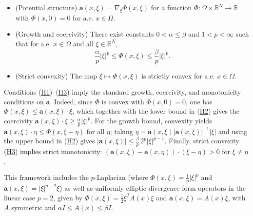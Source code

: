 \documentclass[10pt,twoside,english,reqno,a4paper]{amsart}
\theoremstyle{plain}
\theoremstyle{plain}
\theoremstyle{definition}
\theoremstyle{remark}
\numberwithin{equation}{section}
\newcommand{\R}{\mathbb{R}}
\def\ae{\mathrm{a.e.}}
\begin{document}
\begin{itemize}
\item[\hypertarget{hyp:potential}{(H1)}] (Potential structure) $\mathbf{a}(x,\xi) = \nabla_\xi \Phi(x,\xi)$ for a function $\Phi:\Omega\times\R^N\to\R$ with $\Phi(x,0)=0$ for $\ae$ $x\in\Omega$.

\item[\hypertarget{hyp:growth}{(H2)}] (Growth and coercivity) There exist constants $0 < \alpha \leq \beta$ and $1 < p < \infty$ such that for $\ae$ $x \in \Omega$ and all $\xi \in \R^N$,
\begin{equation*}
\frac{\alpha}{p} |\xi|^p \leq \Phi(x,\xi) \leq \frac{\beta}{p} |\xi|^p.
\end{equation*}

\item[\hypertarget{hyp:convex}{(H3)}] (Strict convexity) The map $\xi \mapsto \Phi(x,\xi)$ is strictly convex for $\ae$ $x \in \Omega$.
\end{itemize}

Conditions \textnormal{(\hyperlink{hyp:potential}{H1})--(\hyperlink{hyp:convex}{H3})} imply the standard growth, coercivity, and monotonicity conditions on $\mathbf{a}$. Indeed, since $\Phi$ is convex with $\Phi(x,0)=0$, one has $\Phi(x,\xi) \leq \mathbf{a}(x,\xi)\cdot\xi$, which together with the lower bound in \textnormal{({\hyperlink{hyp:growth}{H2}})} gives the coercivity $\mathbf{a}(x,\xi)\cdot\xi \geq \frac{\alpha}{p}|\xi|^p$. For the growth bound, convexity yields $\mathbf{a}(x,\xi)\cdot\eta \leq \Phi(x,\xi+\eta)$ for all $\eta$; taking $\eta= \mathbf{a}(x,\xi) |\mathbf{a}(x,\xi)|^{-1} |\xi|$ and using the upper bound in \textnormal{({\hyperlink{hyp:growth}{H2}})} gives $|\mathbf{a}(x,\xi)| \leq \frac{\beta}{p}\, 2^p|\xi|^{p-1}$. Finally, strict convexity \textnormal{(\hyperlink{hyp:convex}{H3})} implies strict monotonicity: $(\mathbf{a}(x,\xi)-\mathbf{a}(x,\eta))\cdot(\xi-\eta)>0$ for $\xi\neq\eta$.

This framework includes the $p$-Laplacian (where $\Phi(x,\xi) = \frac{1}{p}|\xi|^p$ and $\textbf{a}(x,\xi) = |\xi|^{p-2}\xi$) as well as uniformly elliptic divergence form operators in the linear case $p=2$, given by $\Phi(x,\xi) = \frac{1}{2}\xi^T A(x) \xi$ and $\textbf{a}(x,\xi) = A(x) \xi$, with $A$ symmetric and $\alpha I \leq A(x) \leq \beta I$.
\end{document}
